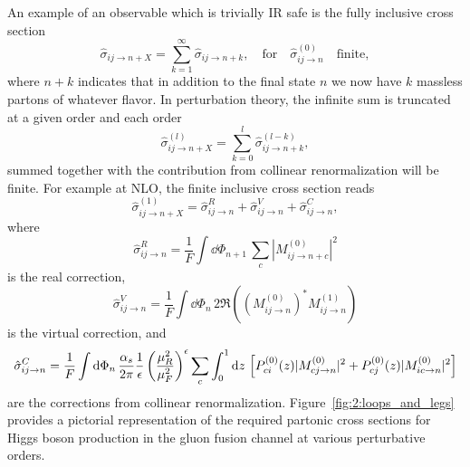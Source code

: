 An example of an observable which is trivially IR safe is the fully inclusive cross section
\begin{equation}
\hat{\sigma}_{ij \rightarrow n+X} = \sum_{k = 1}^\infty \hat{\sigma}_{ij \rightarrow n + k}, \quad \text{for} \quad \hat{\sigma}_{ij \rightarrow n}^{(0)} \quad \text{finite},
\end{equation}
where $n + k$ indicates that in addition to the final state $n$ we now have $k$ massless partons of whatever flavor. In perturbation theory, the infinite sum is truncated at a given order and each order
\begin{equation}
\hat{\sigma}_{ij \rightarrow n+X}^{(l)} = \sum_{k = 0}^l \hat{\sigma}_{ij \rightarrow n + k}^{(l - k)},
\end{equation}
summed together with the contribution from collinear renormalization will be finite. For example at \acs{NLO}, the finite inclusive cross section reads
\begin{equation}
\hat{\sigma}_{ij \rightarrow n+X}^{(1)} = \hat{\sigma}_{ij \rightarrow n}^{R} + \hat{\sigma}_{ij \rightarrow n}^{V} + \hat{\sigma}_{ij \rightarrow n}^C,
\end{equation}
where
\begin{equation}
\hat{\sigma}_{ij \rightarrow n}^R = \frac{1}{F}\int \dd \Phi_{n + 1} \, \sum_c |M_{ij \rightarrow n + c}^{(0)}|^2
\end{equation}
is the real correction,
\begin{equation}
\hat{\sigma}_{ij \rightarrow n}^V = \frac{1}{F} \int \dd \Phi_n \, 2 \Re \left( \left(M_{ij \rightarrow n}^{(0)}\right)^* M_{ij \rightarrow n}^{(1)} \right)
\end{equation}
is the virtual correction, and
\begin{equation}
\hat{\sigma}_{ij \rightarrow n}^C = \frac{1}{F} \int \mathrm{d} \Phi_n \, \frac{\alpha_s}{2 \pi} \frac{1}{\epsilon} \left(\frac{\mu_R^2}{\mu_F^2} \right)^\epsilon \sum_c \int_0^1 \mathrm{d} z\,  \left[ P_{ci}^{(0)}(z) |M_{cj \rightarrow n}^{(0)}|^2 + P_{cj}^{(0)}(z) |M_{ic \rightarrow n}^{(0)}|^2 \right]
\end{equation}
are the corrections from collinear renormalization. Figure~\ref{fig:2:loops_and_legs} provides a pictorial representation of the required partonic cross sections for Higgs boson production in the gluon fusion channel at various perturbative orders.
